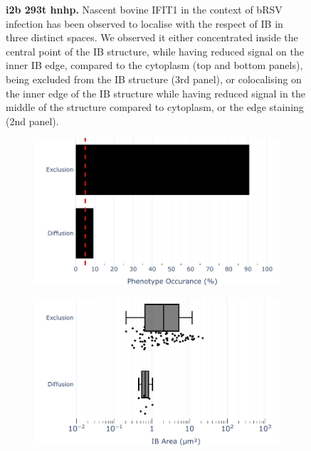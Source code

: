 \begin{figure}
\begin{subfigure}{1\textwidth}
    \end{subfigure}
    \caption[i2b 293t hnhp]{\textbf{i2b 293t hnhp.} Nascent bovine IFIT1 in the context of bRSV infection has been observed to localise with the respect of IB in three distinct spaces. We observed it either concentrated inside the central point of the IB structure, while having reduced signal on the inner IB edge, compared to the cytoplasm (top and bottom panels), being excluded from the IB structure (3rd panel), or colocalising on the inner edge of the IB structure while having reduced signal in the middle of the structure compared to cytoplasm, or the edge staining (2nd panel).}
    \label{fig:i2b 293t hnhp}
\end{figure}


\begin{figure}
    \begin{subfigure}{0.5\textwidth}
        \caption{}
        \includegraphics[width=1\linewidth]{10. Chapter 5/Figs/02. pIB/03. IFIT2B/04. bar_i2b_vero_hnhp.pdf} 
    \end{subfigure}
    \begin{subfigure}{0.5\textwidth}
        \caption{}
        \includegraphics[width=1\linewidth]{10. Chapter 5/Figs/02. pIB/03. IFIT2B/05. box_i2b_vero_hnhp.pdf}

\end{subfigure}
\end{figure}
